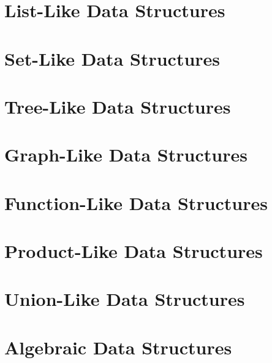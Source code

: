 \documentclass{book}
\begin{document}

\chapter{List-Like Data Structures}\label{sec:ad:lists}
 

\chapter{Set-Like Data Structures}\label{sec:ad:sets}
 

\chapter{Tree-Like Data Structures}\label{sec:ad:trees}
 

\chapter{Graph-Like Data Structures}\label{sec:ad:graphs}

\chapter{Function-Like Data Structures}\label{sec:ad:functions}

\chapter{Product-Like Data Structures}\label{sec:ad:products}

\chapter{Union-Like Data Structures}\label{sec:ad:unions}

\chapter{Algebraic Data Structures}\label{sec:ad:theories}
\end{document}
